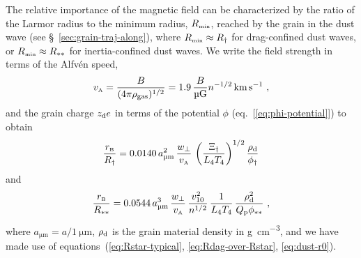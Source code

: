 The relative importance of the magnetic field can be characterized by
the ratio of the Larmor radius to the minimum radius, \(R_{\scriptscriptstyle\text{min}}\),
reached by the grain in the dust wave (see
\S~\ref{sec:grain-traj-along}), where \(R_{\scriptscriptstyle\text{min}} \approx R_\dag\) for
drag-confined dust waves, or \(R_{\scriptscriptstyle\text{min}} \approx R_{**}\) for
inertia-confined dust waves.  We write the field strength in terms of
the Alfvén speed,
\begin{equation}
  \label{eq:alfven}
  v\alfven = \frac{B}{(4\pi\rho\gas)^{1/2}}
  = 1.9\, \frac{B}{\si{\micro G}} n^{-1/2} \, \si{km.s^{-1}} \ ,
\end{equation}
and the grain charge \(z_{\text{d}} e\) in terms of the potential \(\phi\) (eq.~[\ref{eq:phi-potential}]) to obtain
\begin{equation}
  \label{eq:larmor-over-Rdag}
  \frac{r\B}{R_\dag} = 0.0140 \,
  a_{\si{\um}}^2 \,
  \frac{w_\perp}{v\alfven} \,
  \left( \frac{\Xi_\dag}{L_4 T_4} \right)^{1/2}
  \frac{\rho\grain}{\phi_\dag}
\end{equation}
and
\begin{equation}
  \label{eq:larmor-over-Rstarstar}
  \frac{r\B}{R\starstar} = 0.0544 \,
  a_{\si{\um}}^3 \,
  \frac{w_\perp}{v\alfven} \,
  \frac{v_{10}^2 }{n^{1/2}} \,
  \frac{1}{L_4 T_4} \,
  \frac{\rho\grain^2}{\Qp \phi\starstar} \ ,
\end{equation}
where \(a_{\si{\um}} = a / \SI{1}{\um}\), \(\rho_{\text{d}}\) is the grain
material density in \si{g.cm^{-3}}, and we have made use of
equations~(\ref{eq:Rstar-typical}, \ref{eq:Rdag-over-Rstar},
\ref{eq:dust-r0}).

